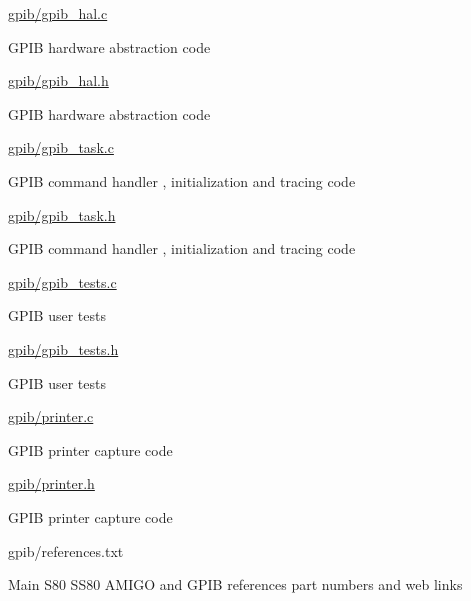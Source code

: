 {\begin{DoxyItemize}
\begin{DoxyItemize}
\begin{DoxyItemize}
\end{DoxyItemize}
\item \hyperlink{gpib__hal_8c}{gpib/gpib\+\_\+hal.\+c}
\begin{DoxyItemize}
\item G\+P\+IB hardware abstraction code
\end{DoxyItemize}
\item \hyperlink{gpib__hal_8h}{gpib/gpib\+\_\+hal.\+h}
\begin{DoxyItemize}
\item G\+P\+IB hardware abstraction code
\end{DoxyItemize}
\item \hyperlink{gpib__task_8c}{gpib/gpib\+\_\+task.\+c}
\begin{DoxyItemize}
\item G\+P\+IB command handler , initialization and tracing code
\end{DoxyItemize}
\item \hyperlink{gpib__task_8h}{gpib/gpib\+\_\+task.\+h}
\begin{DoxyItemize}
\item G\+P\+IB command handler , initialization and tracing code
\end{DoxyItemize}
\item \hyperlink{gpib__tests_8c}{gpib/gpib\+\_\+tests.\+c}
\begin{DoxyItemize}
\item G\+P\+IB user tests
\end{DoxyItemize}
\item \hyperlink{gpib__tests_8h}{gpib/gpib\+\_\+tests.\+h}
\begin{DoxyItemize}
\item G\+P\+IB user tests
\end{DoxyItemize}
\item \hyperlink{printer_8c}{gpib/printer.\+c}
\begin{DoxyItemize}
\item G\+P\+IB printer capture code
\end{DoxyItemize}
\item \hyperlink{printer_8h}{gpib/printer.\+h}
\begin{DoxyItemize}
\item G\+P\+IB printer capture code
\end{DoxyItemize}
\item gpib/references.\+txt
\begin{DoxyItemize}
\item Main S80 S\+S80 A\+M\+I\+GO and G\+P\+IB references part numbers and web links

\end{DoxyItemize}
\end{DoxyItemize}
\end{DoxyItemize}}
